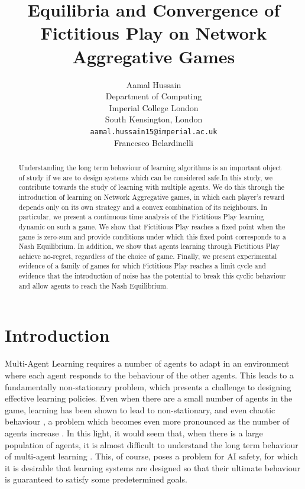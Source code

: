 \documentclass{article}
\title{Equilibria and Convergence of Fictitious Play on Network Aggregative Games}
\author{%
 Aamal Hussain  \\
  Department of Computing\\
  Imperial College London\\
  South Kensington, London \\
  \texttt{aamal.hussain15@imperial.ac.uk} \\
  \And
  Francesco Belardinelli
}
\theoremstyle{definition}
\begin{document}
\maketitle

\begin{abstract}
Understanding the long term behaviour of learning algorithms is an important object of study if we are to design systems which can be considered safe.In this study, we contribute towards the study of learning with multiple agents. We do this through the introduction of learning on Network Aggregative games, in which each player's reward depends only on its own strategy and a convex combination of its neighbours. In particular, we present a continuous time analysis of the Fictitious Play learning dynamic on such a game. We show that Fictitious Play reaches a fixed point when the game is zero-sum and provide conditions under which this fixed point corresponds to a Nash Equilibrium. In addition, we show that agents learning through Fictitious Play achieve no-regret, regardless of the choice of game. Finally, we present experimental evidence of a family of games for which Fictitious Play reaches a limit cycle and evidence that the introduction of noise has the potential to break this cyclic behaviour and allow agents to reach the Nash Equilibrium.
\end{abstract}

\section{Introduction}

Multi-Agent Learning \cite{Schwartz2014} requires a number of agents to adapt in an environment where
each agent responds to the behaviour of the other agents. This leads to a
fundamentally non-stationary problem, which presents a challenge to designing effective learning
policies. Even when there are a small number of agents in the game, learning has been shown to lead
to non-stationary, and even chaotic behaviour \cite{Sato2002}, a problem which becomes even more
pronounced as the number of agents increase \cite{Sanders2018}. In this light, it would seem that, when there is a large population of agents, it is almost difficult to understand the long term behaviour of multi-agent learning \cite{Chotibut2021}. This, of course, poses a problem for AI safety, for which it is desirable that learning systems are designed so that their ultimate behaviour is guaranteed to satisfy some predetermined goals.
\end{document}
